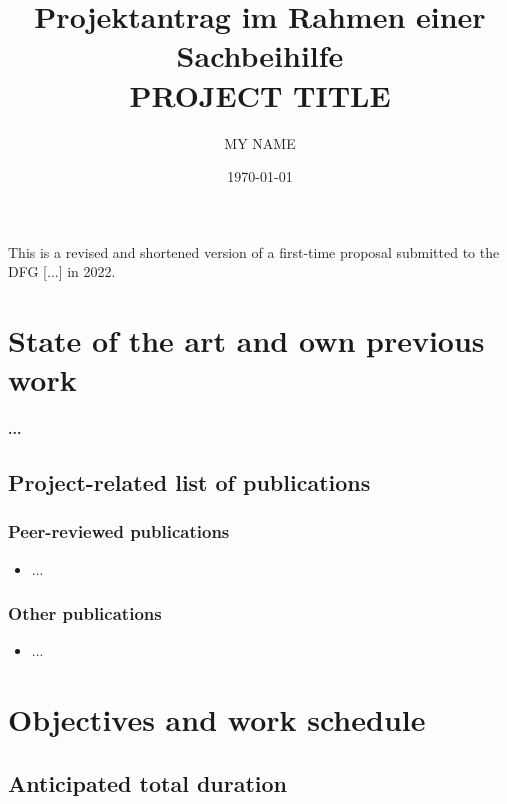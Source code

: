 \documentclass[a4paper,10pt,oneside]{article}
\begin{document}
\title{{\small Projektantrag im Rahmen einer Sachbeihilfe}\\{\bf \LARGE PROJECT TITLE}}
\author{MY NAME}
\date{\today}
\maketitle

\noindent This is a revised and shortened version of a first-time proposal submitted to the DFG [...] in 2022.

\section{State of the art and own previous work}

\paragraph{...}

\subsection{Project-related list of publications}

\subsubsection{Peer-reviewed publications}

\begin{itemize}
  \setlength{\itemindent}{18px}
  \item ...
\end{itemize}

\subsubsection{Other publications}

\begin{itemize}
  \item ...
\end{itemize}

\section{Objectives and work schedule}

\subsection{Anticipated total duration}
\end{document}

